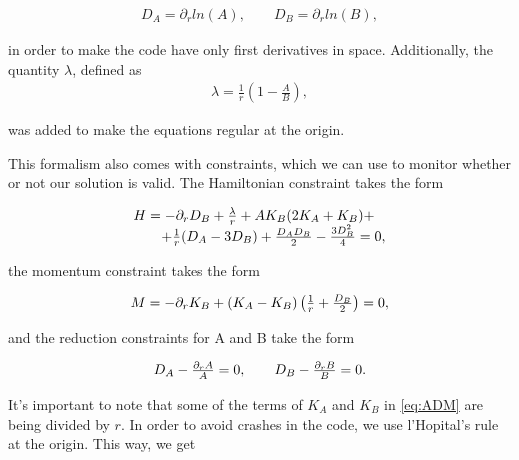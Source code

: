 \begin{align}
    D_A = \partial_r ln(A), \qquad D_B = \partial_r ln(B),
    \label{eq:DA_DB}
\end{align}

\noindent
in order to make the code have only first derivatives in space. Additionally, the quantity $\lambda$, defined as
\begin{align}
    \lambda = \frac{1}{r} \left( 1 - \frac{A}{B} \right),
    \label{eq:lambda}
\end{align}

\noindent
was added to make the equations regular at the origin.

This formalism also comes with constraints, which we can use to monitor whether or not our solution is valid. The Hamiltonian constraint takes the form

\begin{align}
    \begin{array}{@{}l@{}}
        H = - \partial_r D_B + \frac{\lambda}{r} + A K_B(2 K_A + K_B) +\\ \qquad+ \frac{1}{r}(D_A - 3 D_B) + \frac{D_A D_B}{2} - \frac{3 D_B^2}{4} = 0,
    \end{array}
    \label{eq:hamiltonian}
\end{align}

\noindent
the momentum constraint takes the form

\begin{align}
    \begin{array}{@{}l@{}}
        M = - \partial_r K_B + (K_A - K_B) \left( \frac{1}{r} + \frac{D_B}{2} \right) = 0,
    \end{array}
    \label{eq:momentum}
\end{align}

\noindent
and the reduction constraints for A and B take the form

\begin{align}
    \begin{array}{@{}l@{}}
        D_A - \frac{\partial_r A}{A} = 0, \qquad D_B - \frac{\partial_r B}{B} = 0.
    \end{array}
    \label{eq:reduction}
\end{align}

It's important to note that some of the terms of $K_A$ and $K_B$ in \eqref{eq:ADM} are being divided by $r$. In order to avoid crashes in the code, we use l'Hopital's rule at the origin. This way, we get

